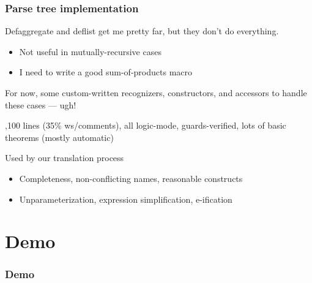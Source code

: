 \documentclass{beamer}
\newcommand{\SmallSkip}{\vspace{0.5cm}\noindent}
\begin{document}
\begin{frame}[fragile]
\frametitle{Parse tree implementation}

Defaggregate and deflist get me pretty far, but they don't do everything.
\begin{itemize}
\item Not useful in mutually-recursive cases
\item I need to write a good sum-of-products macro
\end{itemize}

\SmallSkip 
For now, some custom-written recognizers, constructors, and accessors to
handle these cases --- ugh!

\SmallSkip 2,100 lines (35\% ws/comments), all logic-mode, guards-verified, lots
of basic theorems (mostly automatic)

\SmallSkip Used by our translation process
\begin{itemize}
\item Completeness, non-conflicting names, reasonable constructs
\item Unparameterization, expression simplification, e-ification
\end{itemize}
\end{frame}



\section{Demo}

\begin{frame}[fragile]
\frametitle{Demo}

\end{frame}
\end{document}
